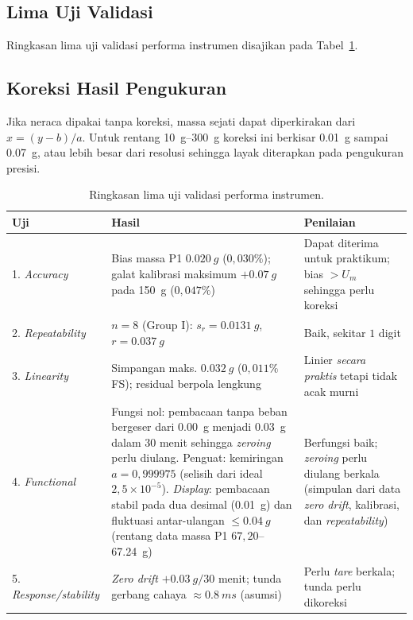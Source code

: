 \documentclass[a4paper, 12pt]{article}
\begin{document}
\subsection{Lima Uji Validasi}
        Ringkasan lima uji validasi performa instrumen disajikan pada Tabel~\ref{tab:valid}.

        \subsection{Koreksi Hasil Pengukuran}
        Jika neraca dipakai tanpa koreksi, massa sejati dapat diperkirakan dari $x=(y-b)/a$. Untuk rentang \SIrange{10}{300}{g} koreksi ini berkisar \SI{0,01}{g} sampai \SI{0,07}{g}, atau lebih besar dari resolusi sehingga layak diterapkan pada pengukuran presisi.
\begin{table}[H]
\centering
\singlespacing
\caption{Ringkasan lima uji validasi performa instrumen.}
\label{tab:valid}
\small
\begin{tabularx}{\textwidth}{@{}l X X@{}}
\toprule
\textbf{Uji} & \textbf{Hasil} & \textbf{Penilaian}\\
\midrule
1. \textit{Accuracy} & Bias massa P1 $\SI{0,020}{g}$ ($0{,}030\%$); galat kalibrasi maksimum $+\SI{0,07}{g}$ pada \SI{150}{g} ($0{,}047\%$) & Dapat diterima untuk praktikum; bias $>U_m$ sehingga perlu koreksi\\
2. \textit{Repeatability} & $n=8$ (Group I): $s_r=\SI{0,0131}{g}$, $r=\SI{0,037}{g}$ & Baik, sekitar $1$ digit\\
3. \textit{Linearity} & Simpangan maks. $\SI{0,032}{g}$ ($0{,}011\%$ FS); residual berpola lengkung & Linier \textit{secara praktis} tetapi tidak acak murni\\
4. \textit{Functional} & Fungsi nol: pembacaan tanpa beban bergeser dari \SI{0,00}{g} menjadi \SI{0,03}{g} dalam $30$ menit sehingga \textit{zeroing} perlu diulang. Penguat: kemiringan $a=0{,}999975$ (selisih dari ideal $2{,}5\times10^{-5}$). \textit{Display}: pembacaan stabil pada dua desimal (\SI{0,01}{g}) dan fluktuasi antar-ulangan $\le\SI{0,04}{g}$ (rentang data massa P1 $67{,}20$--\SI{67,24}{g}) & Berfungsi baik; \textit{zeroing} perlu diulang berkala (simpulan dari data \textit{zero drift}, kalibrasi, dan \textit{repeatability})\\
5. \textit{Response/stability} & \textit{Zero drift} $+\SI{0,03}{g}/30$ menit; tunda gerbang cahaya $\approx\SI{0,8}{ms}$ (asumsi) & Perlu \textit{tare} berkala; tunda perlu dikoreksi\\
\bottomrule
\end{tabularx}
\end{table}
\end{document}
